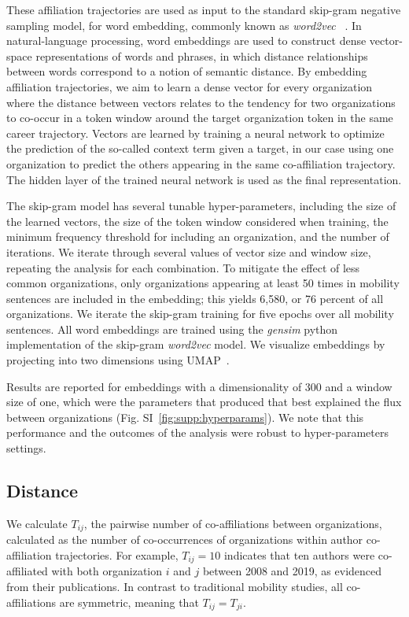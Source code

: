 \documentclass[12pt]{article} %
\begin{document}
These affiliation trajectories are used as input to the standard skip-gram negative sampling model, for word embedding, commonly known as \textit{word2vec}~\autocite{mikolov2013word2vec} .
In natural-language processing, word embeddings are used to construct dense vector-space representations of words and phrases, in which distance relationships between words correspond to a notion of semantic distance.
By embedding affiliation trajectories, we aim to learn a dense vector for every organization where the distance between vectors relates to the tendency for two organizations to co-occur in a token window around the target organization token in the same career trajectory.
Vectors are learned by training a neural network to optimize the prediction of the so-called context term given a target, in our case using one organization to predict the others appearing in the same co-affiliation trajectory.
The hidden layer of the trained neural network is used as the final representation. 


The skip-gram model has several tunable hyper-parameters, including the size of the learned vectors, the size of the token window considered when training, the minimum frequency threshold for including an organization, and the number of iterations.
We iterate through several values of vector size and window size, repeating the analysis for each combination.
To mitigate the effect of less common organizations, only organizations appearing at least 50 times in mobility sentences are included in the embedding;
this yields 6,580, or 76 percent of all organizations.
We iterate the skip-gram training for five epochs over all mobility sentences.
All word embeddings are trained using the \textit{gensim} python implementation of the skip-gram \textit{word2vec} model.
We visualize embeddings by projecting into two dimensions using UMAP~\autocite{mcinnes2018umap}.

Results are reported for embeddings with a dimensionality of 300 and a window size of one, which were the parameters that produced that best explained the flux between organizations (Fig. SI~\ref{fig:supp:hyperparams}).
We note that this performance and the outcomes of the analysis were robust to hyper-parameters settings.




%
%
\subsection*{Distance}
We calculate $T_{ij}$, the pairwise number of co-affiliations between organizations, calculated as the number of co-occurrences of organizations within author co-affiliation trajectories.
For example, $T_{ij} = 10$ indicates that ten authors were co-affiliated with both organization $i$ and $j$ between 2008 and 2019, as evidenced from their publications.
In contrast to traditional mobility studies, all co-affiliations are symmetric, meaning that $T_{ij} = T_{ji}$.
\end{document}
